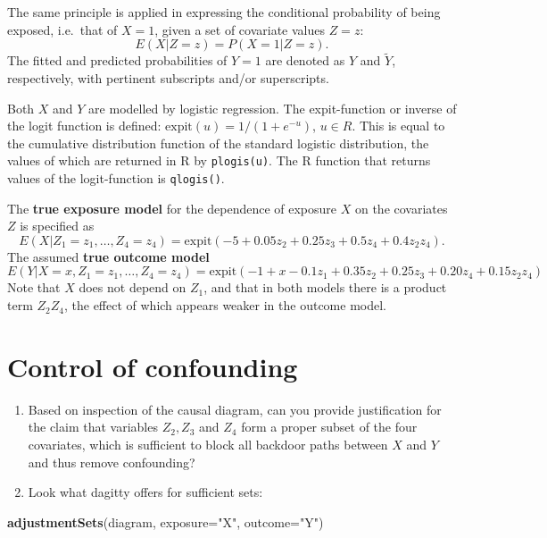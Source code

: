 \documentclass[
]{book}
\newenvironment{Shaded}{\begin{snugshade}}{\end{snugshade}}
\newcommand{\AttributeTok}[1]{\textcolor[rgb]{0.13,0.29,0.53}{#1}}
\newcommand{\FunctionTok}[1]{\textcolor[rgb]{0.13,0.29,0.53}{\textbf{#1}}}
\newcommand{\NormalTok}[1]{#1}
\newcommand{\StringTok}[1]{\textcolor[rgb]{0.31,0.60,0.02}{#1}}
\theoremstyle{definition}
\theoremstyle{definition}
\theoremstyle{definition}
\theoremstyle{definition}
\theoremstyle{remark}
\begin{document}
The same principle is applied in expressing the conditional probability
of being exposed, i.e.~that of \(X=1\), given a set of covariate values
\(Z=z\): \[ E(X|Z=z) = P(X=1|Z=z). \] The fitted and predicted
probabilities of \(Y=1\) are denoted as \(\widehat{Y}\) and \(\widetilde{Y}\),
respectively, with pertinent subscripts and/or superscripts.

Both \(X\) and \(Y\) are modelled by logistic regression. The expit-function
or inverse of the logit function is defined:
\(\text{expit}(u) = 1/(1 + e^{-u})\), \(u\in R\). This is equal to the
cumulative distribution function of the standard logistic distribution,
the values of which are returned in R by \texttt{plogis(u)}. The R function
that returns values of the logit-function is \texttt{qlogis()}.

The \textbf{true exposure model} for the dependence of exposure \(X\) on the
covariates \(Z\) is specified as \[ E(X|Z_1 = z_1, \dots, Z_4 = z_4) =
      \text{expit}(-5 + 0.05z_2 + 0.25z_3 + 0.5z_4 + 0.4z_2z_4) . \] The
assumed \textbf{true outcome model}
\[ E(Y|X=x, Z_1 = z_1, \dots, Z_4 = z_4) =
           \text{expit}(-1 + x - 0.1z_1 + 0.35z_2 + 0.25z_3 +
                 0.20z_4 + 0.15z_2z_4) \] Note that \(X\) does not depend
on \(Z_1\), and that in both models there is a product term \(Z_2 Z_4\), the
effect of which appears weaker in the outcome model.

\section{Control of confounding}\label{control-of-confounding}

\begin{enumerate}
\def\labelenumi{\arabic{enumi}.}
\item
  Based on inspection of the causal diagram, can you provide
  justification for the claim that variables \(Z_2, Z_3\) and \(Z_4\) form
  a proper subset of the four covariates, which is sufficient to block
  all backdoor paths between \(X\) and \(Y\) and thus remove confounding?
\item
  Look what dagitty offers for sufficient sets:
\end{enumerate}

\begin{Shaded}
\begin{Highlighting}[]
\FunctionTok{adjustmentSets}\NormalTok{(diagram, }\AttributeTok{exposure=}\StringTok{"X"}\NormalTok{, }\AttributeTok{outcome=}\StringTok{"Y"}\NormalTok{)}
\end{Highlighting}
\end{Shaded}
\end{document}
